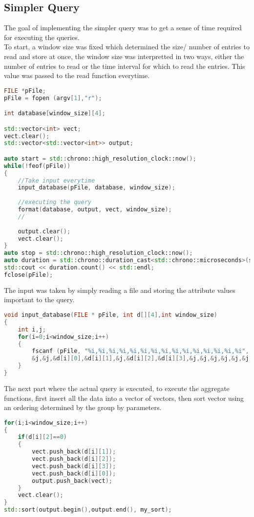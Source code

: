 \subsection{Simpler Query}
The goal of implementing the simpler query was to get a sense of time required for executing the queries.\\
To start, a window size was fixed which determined the size/ number of entries to read and store at once, the window size was interpretted in two ways, either the number of entries to read or the time interval for which to read the entries. This value was passed to the read function everytime.
\begin{lstlisting}[language=C++]
FILE *pFile;
pFile = fopen (argv[1],"r");

int database[window_size][4];

std::vector<int> vect;
vect.clear();
std::vector<std::vector<int>> output;

auto start = std::chrono::high_resolution_clock::now();
while(!feof(pFile))
{
    //Take input everytime
    input_database(pFile, database, window_size);
    
    //executing the query
    format(database, output, vect, window_size);
    // 
    
    output.clear();
    vect.clear();
}
auto stop = std::chrono::high_resolution_clock::now(); 
auto duration = std::chrono::duration_cast<std::chrono::microseconds>(stop - start);
std::cout << duration.count() << std::endl;
fclose(pFile);
\end{lstlisting}
The input was taken by simply reading a file and storing the attribute values important to the query. 
\begin{lstlisting}[language=C++]
void input_database(FILE * pFile, int d[][4],int window_size)
{
    int i,j;
    for(i=0;i<window_size;i++)
    {
        fscanf (pFile, "%i,%i,%i,%i,%i,%i,%i,%i,%i,%i,%i,%i,%i,%i,%i", &j,
        &j,&j,&d[i][0],&d[i][1],&j,&d[i][2],&d[i][3],&j,&j,&j,&j,&j,&j,&j);
    }
}
\end{lstlisting}
The next part where the actual query is executed, to execute the aggregate functions, first insert all the data into a vector of vectors, then sort vector using an ordering determined by the group by parameters. 
\begin{lstlisting}[language=C++]
for(i;i<window_size;i++)
{
    if(d[i][2]==0)
    {
        vect.push_back(d[i][1]);
        vect.push_back(d[i][2]);
        vect.push_back(d[i][3]);
        vect.push_back(d[i][0]);
        output.push_back(vect);
    }
    vect.clear();
}
std::sort(output.begin(),output.end(), my_sort);
\end{lstlisting}
